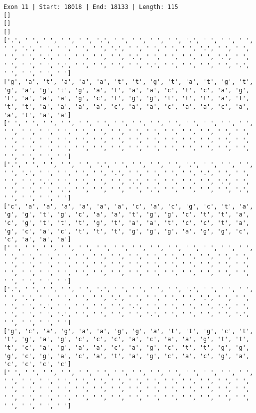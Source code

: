 \documentclass{article}
\begin{document}
\begin{Verbatim}
Exon 11 | Start: 18018 | End: 18133 | Length: 115
[]
[]
[]
['.', ' ', ' ', ' ', ' ', '.', ' ', ' ', ' ', ' ', '.', ' ', ' ', ' ', ' ', '.', ' ', ' ', ' ', ' ', '.', ' ', ' ', ' ', ' ', '.', ' ', ' ', ' ', ' ', '.', ' ', ' ', ' ', ' ', '.', ' ', ' ', ' ', ' ', '.', ' ', ' ', ' ', ' ', '.', ' ', ' ', ' ', ' ', '.', ' ', ' ', ' ', ' ', '.', ' ', ' ', ' ', ' ']
['g', 'a', 't', 'a', 'a', 'a', 't', 't', 'g', 't', 'a', 't', 'g', 't', 'g', 'a', 'g', 't', 'g', 'a', 't', 'a', 'a', 'c', 't', 'c', 'a', 'g', 't', 'a', 'a', 'a', 'g', 'c', 't', 'g', 'g', 't', 't', 't', 'a', 't', 't', 't', 'a', 'a', 'a', 'a', 'c', 'a', 'a', 'c', 'a', 'a', 'c', 'a', 'a', 't', 'a', 'a']
[' ', ' ', ' ', ' ', ' ', ' ', ' ', ' ', ' ', ' ', ' ', ' ', ' ', ' ', ' ', ' ', ' ', ' ', ' ', ' ', ' ', ' ', ' ', ' ', ' ', ' ', ' ', ' ', ' ', ' ', ' ', ' ', ' ', ' ', ' ', ' ', ' ', ' ', ' ', ' ', ' ', ' ', ' ', ' ', ' ', ' ', ' ', ' ', ' ', ' ', ' ', ' ', ' ', ' ', ' ', ' ', ' ', ' ', ' ', ' ']
['.', ' ', ' ', ' ', ' ', '.', ' ', ' ', ' ', ' ', '.', ' ', ' ', ' ', ' ', '.', ' ', ' ', ' ', ' ', '.', ' ', ' ', ' ', ' ', '.', ' ', ' ', ' ', ' ', '.', ' ', ' ', ' ', ' ', '.', ' ', ' ', ' ', ' ', '.', ' ', ' ', ' ', ' ', '.', ' ', ' ', ' ', ' ', '.', ' ', ' ', ' ', ' ', '.', ' ', ' ', ' ', ' ']
['c', 'a', 'a', 'a', 'a', 'a', 'a', 'c', 'a', 'c', 'g', 'c', 't', 'a', 'g', 'g', 't', 'g', 'c', 'a', 'a', 't', 'g', 'g', 'c', 't', 't', 'a', 'c', 'g', 't', 't', 't', 'g', 't', 'a', 'a', 't', 'c', 'c', 't', 'a', 'g', 'c', 'a', 'c', 't', 't', 't', 'g', 'g', 'g', 'a', 'g', 'g', 'c', 'c', 'a', 'a', 'a']
[' ', ' ', ' ', ' ', ' ', ' ', ' ', ' ', ' ', ' ', ' ', ' ', ' ', ' ', ' ', ' ', ' ', ' ', ' ', ' ', ' ', ' ', ' ', ' ', ' ', ' ', ' ', ' ', ' ', ' ', ' ', ' ', ' ', ' ', ' ', ' ', ' ', ' ', ' ', ' ', ' ', ' ', ' ', ' ', ' ', ' ', ' ', ' ', ' ', ' ', ' ', ' ', ' ', ' ', ' ', ' ', ' ', ' ', ' ', ' ']
['.', ' ', ' ', ' ', ' ', '.', ' ', ' ', ' ', ' ', '.', ' ', ' ', ' ', ' ', '.', ' ', ' ', ' ', ' ', '.', ' ', ' ', ' ', ' ', '.', ' ', ' ', ' ', ' ', '.', ' ', ' ', ' ', ' ', '.', ' ', ' ', ' ', ' ', '.', ' ', ' ', ' ', ' ', '.', ' ', ' ', ' ', ' ', '.', ' ', ' ', ' ', ' ', '.', ' ', ' ', ' ', ' ']
['g', 'c', 'a', 'g', 'a', 'a', 'g', 'g', 'a', 't', 't', 'g', 'c', 't', 't', 'g', 'a', 'g', 'c', 'c', 'c', 'a', 'c', 'a', 'a', 'g', 't', 't', 't', 'c', 'a', 'g', 'a', 'a', 'c', 'a', 'g', 'c', 't', 't', 'g', 'g', 'g', 'c', 'g', 'a', 'c', 'a', 't', 'a', 'g', 'c', 'a', 'c', 'g', 'a', 'c', 'c', 'c', 'c']
[' ', ' ', ' ', ' ', ' ', ' ', ' ', ' ', ' ', ' ', ' ', ' ', ' ', ' ', ' ', ' ', ' ', ' ', ' ', ' ', ' ', ' ', ' ', ' ', ' ', ' ', ' ', ' ', ' ', ' ', ' ', ' ', ' ', ' ', ' ', ' ', ' ', ' ', ' ', ' ', ' ', ' ', ' ', ' ', ' ', ' ', ' ', ' ', ' ', ' ', ' ', ' ', ' ', ' ', ' ', ' ', ' ', ' ', ' ', ' ']

\end{Verbatim}
\end{document}
